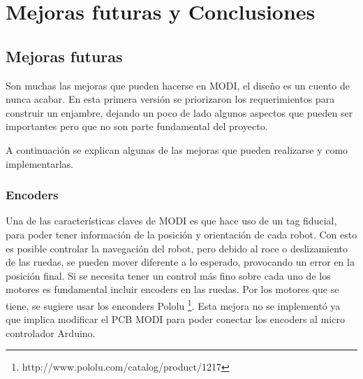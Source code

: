 
\chapter{Mejoras futuras y Conclusiones} %

\label{ChapterX} %



\section{Mejoras futuras}

Son muchas las mejoras que pueden hacerse en MODI, el diseño es un cuento de nunca acabar. En esta primera versión se priorizaron los requerimientos para construir un enjambre, dejando un poco de lado algunos aspectos que pueden ser importantes pero que no son parte fundamental del proyecto.

A continuación se explican algunas de las mejoras que pueden realizarse y como implementarlas.


\subsection{Encoders}
Una de las características claves de MODI es que hace uso de un tag fiducial, para poder tener información de la posición y orientación de cada robot. Con esto es posible controlar la navegación del robot, pero debido al roce o deslizamiento de las ruedas, se pueden mover diferente a lo esperado, provocando un error en la posición final. Si se necesita tener un control más fino sobre cada uno de los motores es fundamental incluir encoders en las ruedas. Por los motores que se tiene, se sugiere usar los enconders Pololu \footnote{http://www.pololu.com/catalog/product/1217}. Esta mejora no se implementó ya que implica modificar el PCB MODI para poder conectar los encoders al micro controlador Arduino.

